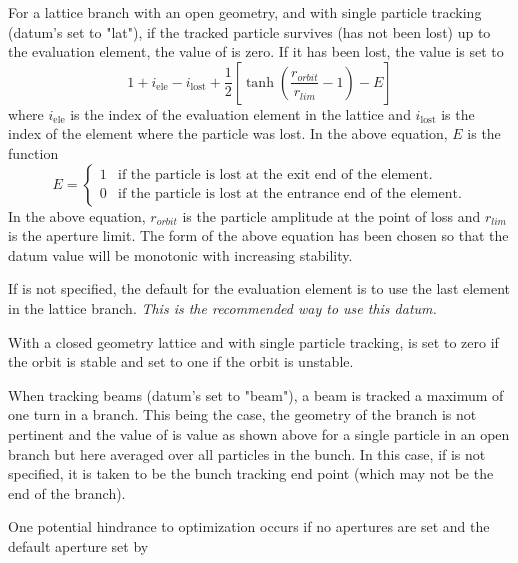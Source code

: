 \begin{description}
{{{{{{{{{{For a lattice branch with an open geometry, and with single particle tracking (datum's
 set to "lat"), if the tracked particle survives (has not been lost) up to the
evaluation element, the value of  is zero. If it has been lost, the value is set
to
\begin{equation}
 1 + i_{\mbox{ele}} - i_{\mbox{lost}} + \frac{1}{2}
 \left[ \tanh\left( \frac{r_{orbit}}{r_{lim}} - 1 \right) - E \right]
\end{equation}
where $i_{\mbox{ele}}$ is the index of the evaluation element in the lattice and $i_{\mbox{lost}}$
is the index of the element where the particle was lost. In the above equation, $E$ is the function
\begin{equation}
  E = 
  \begin{cases}
    1 & \text{if the particle is lost at the exit end of the element.} \\
    0 & \text{if the particle is lost at the entrance end of the element.}
  \end{cases}
\end{equation}
In the above equation, $r_{orbit}$ is the particle amplitude at the point of loss and $r_{lim}$ is
the aperture limit. The form of the above equation has been chosen so that the datum value will be
monotonic with increasing stability.

If  is not specified, the default for the evaluation element is to use
the last element in the lattice branch. {\em This is the recommended way to use this datum.}

With a closed geometry lattice and with single particle tracking,  is set to zero
if the orbit is stable and set to one if the orbit is unstable.

When tracking beams (datum's  set to "beam"), a beam is tracked a maximum of one
turn in a branch. This being the case, the geometry of the branch is not pertinent and the value of
 is value as shown above for a single particle in an open branch but here averaged
over all particles in the bunch. In this case, if  is not specified, it is taken to be
the bunch tracking end point (which may not be the end of the branch).

One potential hindrance to optimization occurs if no apertures are set and the default aperture set by
\vn{bmad_com%
with the orbit oscillating with large amplitude, that it is hard for the optimizer to find a stable
solution. The fix is either to set individual apertures or \vn{bmad_com%
prevent the large orbit oscillations. Apertures of 0.1~meter or less are generally advised.


}}}}}}}}}}}}
\end{description}
